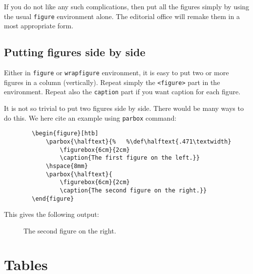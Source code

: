 If you do not like any such complications, then put all the figures
simply by using the usual \verb+figure+ environment alone. 
The editorial office will remake them in a most appropriate form.

\subsection{Putting figures side by side}

Either in {\tt figure} or {\tt wrapfigure} environment, 
it is easy to put two or more figures in a column (vertically). 
Repeat simply the {\tt <figure>} part in the environment. 
Repeat also the {\tt \BS caption} part if you want 
caption for each figure.

It is not so trivial to put two figures side by side. There would be 
many ways to do this. We here cite an example using 
{\tt \BS parbox} command:
\begin{verbatim}
        \begin{figure}[htb]
            \parbox{\halftext}{%   %\def\halftext{.471\textwidth}
                \figurebox{6cm}{2cm}
                \caption{The first figure on the left.}}
            \hspace{8mm}
            \parbox{\halftext}{
                \figurebox{6cm}{2cm}
                \caption{The second figure on the right.}}
        \end{figure}
\end{verbatim}
This gives the following output:
\begin{figure}[htb]
 \parbox{\halftext}{\figurebox{6cm}{2cm}
                \caption{The first figure on the left.}}
 \hspace{8mm}
 \parbox{\halftext}{\figurebox{6cm}{2cm}
                \caption{The second figure on the right.}}
\end{figure}


\section{Tables}

